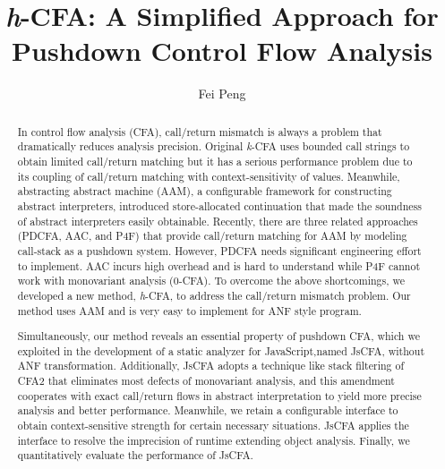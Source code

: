 \documentclass{article}
\title{\textit{h}-CFA\@: A Simplified Approach for\\ Pushdown Control Flow Analysis}
\author{Fei Peng}
\begin{document}
\maketitle
\begin{abstract}
  In control flow analysis (CFA), call/return mismatch is always a problem that dramatically reduces analysis precision.
  Original \textit{k}-CFA uses bounded call strings to obtain limited call/return matching but it has a serious performance problem
  due to its coupling of call/return matching with context-sensitivity of values.
  Meanwhile, abstracting abstract machine (AAM), a configurable framework for constructing abstract interpreters,
  introduced store-allocated continuation that made the soundness of abstract interpreters easily obtainable.
  Recently, there are three related approaches (PDCFA, AAC, and P4F) that provide call/return matching for AAM by modeling call-stack as a pushdown system.
  However, PDCFA needs significant engineering effort to implement.
  AAC incurs high overhead and is hard to understand while P4F cannot work with monovariant analysis (0-CFA).
  To overcome the above shortcomings, we developed a new method, \textit{h}-CFA, to address the call/return mismatch problem.
  Our method uses AAM and is very easy to implement for ANF style program.

  Simultaneously, our method reveals an essential property of pushdown CFA,
  which we exploited in the development of a static analyzer for JavaScript,named JsCFA, without ANF transformation.
  Additionally, JsCFA adopts a technique like stack filtering of CFA2 that eliminates most defects of monovariant analysis, and this amendment cooperates with exact call/return flows in abstract interpretation to yield more precise analysis and better performance.
  Meanwhile, we retain a configurable interface to obtain context-sensitive strength for certain necessary situations.
  JsCFA applies the interface to resolve the imprecision of runtime extending object analysis. Finally, we quantitatively evaluate the performance of JsCFA.%
\end{abstract}


\end{document}
